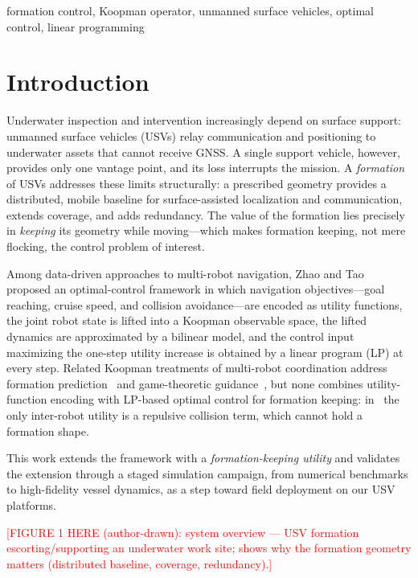 \documentclass[conference]{IEEEtran}
\newcommand{\todo}[1]{\textcolor{red}{[#1]}}
\begin{document}
\begin{IEEEkeywords}
formation control, Koopman operator, unmanned surface vehicles, optimal control, linear programming
\end{IEEEkeywords}

\section{Introduction}
Underwater inspection and intervention increasingly depend on surface support: unmanned surface vehicles (USVs) relay communication and positioning to underwater assets that cannot receive GNSS. A single support vehicle, however, provides only one vantage point, and its loss interrupts the mission. A \emph{formation} of USVs addresses these limits structurally: a prescribed geometry provides a distributed, mobile baseline for surface-assisted localization and communication, extends coverage, and adds redundancy. The value of the formation lies precisely in \emph{keeping} its geometry while moving---which makes formation keeping, not mere flocking, the control problem of interest.

Among data-driven approaches to multi-robot navigation, Zhao and Tao~\cite{tao2023merged} proposed an optimal-control framework in which navigation objectives---goal reaching, cruise speed, and collision avoidance---are encoded as utility functions, the joint robot state is lifted into a Koopman observable space, the lifted dynamics are approximated by a bilinear model, and the control input maximizing the one-step utility increase is obtained by a linear program (LP) at every step. Related Koopman treatments of multi-robot coordination address formation prediction~\cite{wang2022koopman} and game-theoretic guidance~\cite{zhao2023stackelberg}, but none combines utility-function encoding with LP-based optimal control for formation keeping: in~\cite{tao2023merged} the only inter-robot utility is a repulsive collision term, which cannot hold a formation shape.

This work extends the framework with a \emph{formation-keeping utility} and validates the extension through a staged simulation campaign, from numerical benchmarks to high-fidelity vessel dynamics, as a step toward field deployment on our USV platforms.

\todo{FIGURE 1 HERE (author-drawn): system overview --- USV formation escorting/supporting an underwater work site; shows why the formation geometry matters (distributed baseline, coverage, redundancy).}
\end{document}
